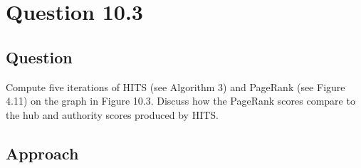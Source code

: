 \section{Question 10.3}

\subsection{Question}
Compute five iterations of HITS (see Algorithm 3) and PageRank (see Figure 4.11) on the graph in Figure 10.3. Discuss how the PageRank scores compare to the hub and authority scores produced by HITS.

\subsection{Approach}

